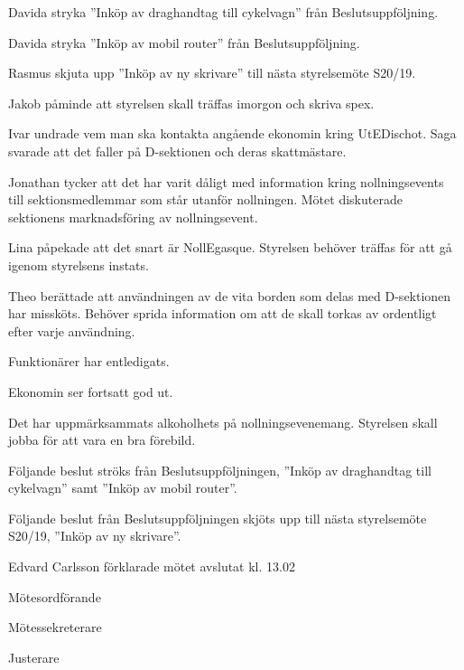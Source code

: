 \documentclass[10pt]{article}
\def\mo{Edvard Carlsson}
\def\ms{Mattias Lundström}
\def\ji{Theo Nyman}
\begin{document}
\begin{paragrafer}
Davida \ypa stryka ''Inköp av draghandtag till cykelvagn'' från Beslutsuppföljning.

\Mbaby

Davida \ypa stryka ''Inköp av mobil router'' från Beslutsuppföljning.

\Mbaby

Rasmus \ypa skjuta upp ''Inköp av ny skrivare'' till nästa styrelsemöte S20/19.

\Mbaby 



Jakob påminde att styrelsen skall träffas imorgon och skriva spex.

Ivar undrade vem man ska kontakta angående ekonomin kring UtEDischot. Saga svarade att det faller på D-sektionen och deras skattmästare. 

Jonathan tycker att det har varit dåligt med information kring nollningsevents till sektionsmedlemmar som står utanför nollningen. 
Mötet diskuterade sektionens marknadsföring av nollningsevent.  

Lina påpekade att det snart är NollEgasque. Styrelsen behöver träffas för att gå igenom styrelsens instats. 

Theo berättade att användningen av de vita borden som delas med D-sektionen har missköts. Behöver sprida information om att de skall torkas av ordentligt efter varje användning. 

Funktionärer har entledigats.

Ekonomin ser fortsatt god ut. 

Det har uppmärksammats alkoholhets på nollningsevenemang. Styrelsen skall jobba för att vara en bra förebild.

Följande beslut ströks från Beslutsuppföljningen, ''Inköp av draghandtag till cykelvagn'' samt ''Inköp av mobil router''.  

Följande beslut från Beslutsuppföljningen skjöts upp till nästa styrelsemöte S20/19, ''Inköp av ny skrivare''.


{\mo} förklarade mötet avslutat kl. 13.02
\end{paragrafer}

\hidesignfoot
\begin{signatures}{3}
\signature{\mo}{Mötesordförande}
\signature{\ms}{Mötessekreterare}
\signature{\ji}{Justerare}
\end{signatures}
\end{document}
